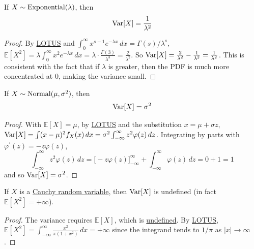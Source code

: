   \begin{theorem}
    \label{thm:variance-of-exponential}
    If \hyperref[def:exponential-random-variable]{$X \sim \operatorname{Exponential}(\lambda)$}, then 
    \begin{equation}
      \operatorname{Var}[X] = \frac{1}{\lambda^2}
    \end{equation}
  \end{theorem}
  \begin{proof}
    By \hyperref[thm:lotus]{LOTUS} and $\int_0^\infty x^{s-1} e^{-\lambda x} \,dx = \Gamma(s) / \lambda^s$, $\mathbb{E}[X^2] = \lambda \int_0^\infty x^2 e^{-\lambda x} \,dx = \lambda \cdot \frac{\Gamma(3)}{\lambda^3} = \frac{2}{\lambda^2}$. So $\operatorname{Var}[X] = \frac{2}{\lambda^2} - \frac{1}{\lambda^2} = \frac{1}{\lambda^2}$. This is consistent with the fact that if $\lambda$ is greater, then the PDF is much more concentrated at $0$, making the variance small. 
  \end{proof}

  \begin{theorem}
    \label{thm:variance-of-gaussian}
    If \hyperref[def:gaussian-random-variable]{$X \sim \operatorname{Normal}(\mu, \sigma^2)$}, then 
    \begin{equation}
      \operatorname{Var}[X] = \sigma^2
    \end{equation}
  \end{theorem}
  \begin{proof}
    With $\mathbb{E}[X] = \mu$, by \hyperref[thm:lotus]{LOTUS} and the substitution $x = \mu + \sigma z$, $\operatorname{Var}[X] = \int (x - \mu)^2 f_X (x) \,dx = \sigma^2 \int_{-\infty}^\infty z^2 \varphi(z) \,dz$. Integrating by parts with $\varphi^\prime (z) = -z \varphi(z)$, 
    \begin{equation}
      \int_{-\infty}^\infty z^2 \varphi(z) \,dz = \Big[ -z \varphi(z) \Big]_{-\infty}^\infty + \int_{-\infty}^\infty \varphi(z) \,dz = 0 + 1 = 1
    \end{equation}
    and so $\operatorname{Var}[X] = \sigma^2$. 
  \end{proof}

  \begin{theorem}
    \label{thm:variance-of-cauchy}
    If $X$ is a \hyperref[def:cauchy-random-variable-standardized]{Cauchy random variable}, then $\operatorname{Var}[X]$ is undefined (in fact $\mathbb{E}[X^2] = +\infty$). 
  \end{theorem}
  \begin{proof}
    The variance requires $\mathbb{E}[X]$, which is \hyperref[thm:expectation-of-cauchy]{undefined}. By \hyperref[thm:lotus]{LOTUS}, $\mathbb{E}[X^2] = \int_{-\infty}^\infty \frac{x^2}{\pi (1 + x^2)} \,dx = +\infty$ since the integrand tends to $1/\pi$ as $|x| \to \infty$. 
  \end{proof}

